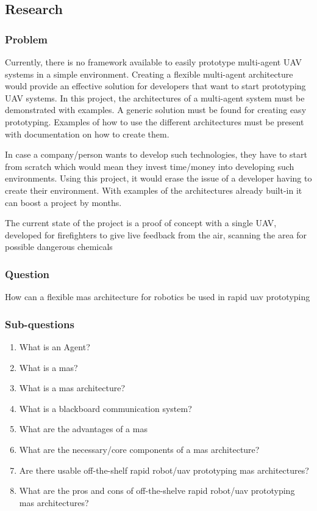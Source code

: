 \subsection{Research}
\subsubsection{Problem}

Currently, there is no framework available to easily prototype multi-agent UAV systems in a simple environment. Creating a flexible multi-agent architecture would provide an effective solution for developers that want to start prototyping UAV systems. In this project, the architectures of a multi-agent system must be demonstrated with examples. A generic solution must be found for creating easy prototyping. Examples of how to use the different architectures must be present with documentation on how to create them.

In case a company/person wants to develop such technologies, they have to start from scratch which would mean they invest time/money into developing such environments. Using this project, it would erase the issue of a developer having to create their environment. With examples of the architectures already built-in it can boost a project by months.

The current state of the project is a proof of concept with a single UAV, developed for firefighters to give live feedback from the air, scanning the area for possible dangerous chemicals

\subsubsection{Question}

How can a flexible \acs{mas} architecture for robotics be used in rapid \acs{uav} prototyping

\subsubsection{Sub-questions}
\begin{enumerate}
    \item What is an Agent?
    \item What is a \acs{mas}?
    \item What is a \acs{mas} architecture?
    \item What is a blackboard communication system?
    \item What are the advantages of a \acs{mas}
    \item What are the necessary/core components of a \acs{mas} architecture?
    \item Are there usable off-the-shelf rapid robot/\acs{uav} prototyping \acs{mas} architectures?
    \item What are the pros and cons of off-the-shelve rapid robot/\acs{uav} prototyping \acs{mas} architectures?
  \end{enumerate}
\newpage

